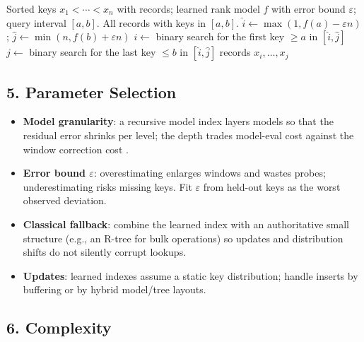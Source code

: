 \begin{algorithm}[htbp]
\caption{Learned Range Search}
\label{alg:data_ml_learned_range}
\begin{algorithmic}[1]
\Require Sorted keys $x_1 < \cdots < x_n$ with records; learned rank model $f$ with error bound $\varepsilon$; query interval $[a, b]$.
\Ensure All records with keys in $[a, b]$.
  \State $\hat{i} \gets \max(1, f(a) - \varepsilon n)$; $\hat{j} \gets \min(n, f(b) + \varepsilon n)$
  \State $i \gets$ binary search for the first key $\geq a$ in $[\hat{i}, \hat{j}]$
  \State $j \gets$ binary search for the last key $\leq b$ in $[\hat{i}, \hat{j}]$
  \State \Return records $x_i, \dots, x_j$
\EndFunction
\end{algorithmic}
\end{algorithm}

\subsection{5. Parameter Selection}

\begin{itemize}
\item \textbf{Model granularity}: a recursive model index layers models so
  that the residual error shrinks per level; the depth trades model-eval
  cost against the window correction cost \cite{kraska2018}.
\item \textbf{Error bound $\varepsilon$}: overestimating enlarges windows and
  wastes probes; underestimating risks missing keys. Fit $\varepsilon$ from
  held-out keys as the worst observed deviation.
\item \textbf{Classical fallback}: combine the learned index with an
  authoritative small structure (e.g., an R-tree for bulk operations) so
  updates and distribution shifts do not silently corrupt lookups.
\item \textbf{Updates}: learned indexes assume a static key distribution;
  handle inserts by buffering or by hybrid model/tree layouts.
\end{itemize}

\subsection{6. Complexity}

